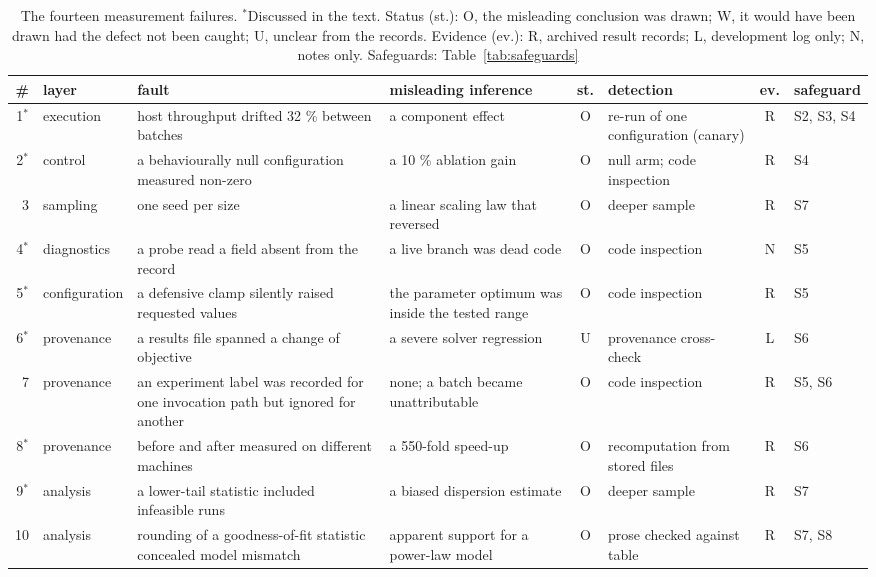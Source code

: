 \begin{table}[t]
\centering
\caption{The fourteen measurement failures. $^{*}$Discussed in the text. Status (st.): O, the misleading
conclusion was drawn; W, it would have been drawn had the defect not been caught; U, unclear from the
records. Evidence (ev.): R, archived result records; L, development log only; N, notes only. Safeguards:
Table~\ref{tab:safeguards}}
\label{tab:incidents}
\footnotesize
\begin{adjustbox}{max width=\textwidth}
\begin{tabular}{@{}r l p{45mm} p{37mm} c p{30mm} c l@{}}
\toprule
\# & layer & fault & misleading inference & st. & detection & ev. & safeguard \\
\midrule
1$^{*}$ & execution & host throughput drifted 32 \% between batches & a component effect & O & re-run of one configuration (canary) & R & S2, S3, S4 \\
2$^{*}$ & control & a behaviourally null configuration measured non-zero & a 10 \% ablation gain & O & null arm; code inspection & R & S4 \\
3 & sampling & one seed per size & a linear scaling law that reversed & O & deeper sample & R & S7 \\
4$^{*}$ & diagnostics & a probe read a field absent from the record & a live branch was dead code & O & code inspection & N & S5 \\
5$^{*}$ & configuration & a defensive clamp silently raised requested values & the parameter optimum was inside the tested range & O & code inspection & R & S5 \\
6$^{*}$ & provenance & a results file spanned a change of objective & a severe solver regression & U & provenance cross-check & L & S6 \\
7 & provenance & an experiment label was recorded for one invocation path but ignored for another & none; a batch became unattributable & O & code inspection & R & S5, S6 \\
8$^{*}$ & provenance & before and after measured on different machines & a 550-fold speed-up & O & recomputation from stored files & R & S6 \\
9$^{*}$ & analysis & a lower-tail statistic included infeasible runs & a biased dispersion estimate & O & deeper sample & R & S7 \\
10 & analysis & rounding of a goodness-of-fit statistic concealed model mismatch & apparent support for a power-law model & O & prose checked against table & R & S7, S8 \\

\end{tabular}
\end{adjustbox}
\end{table}
